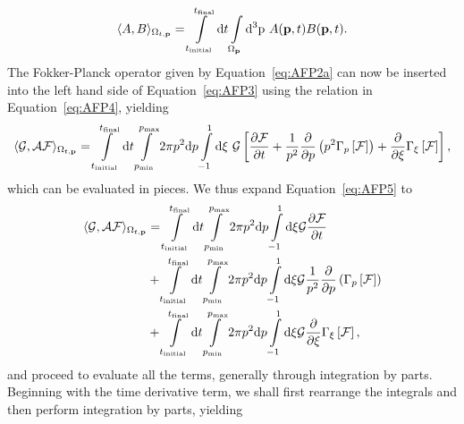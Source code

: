\documentclass[preprint,aip]{revtex4-2}
\begin{document}
\begin{equation}\label{eq:AFP4}
\langle A,B\rangle_{\Omega_{t,\mathbf{p}}} = \int\displaylimits_{t_\mathrm{initial}}^{t_\mathrm{final}}\mathrm{d}t\int\displaylimits_{\Omega_\mathbf{p}}\mathrm{d^3p} \ A(\mathbf{p},t)B(\mathbf{p},t).
\end{equation}
The Fokker-Planck operator given by Equation~\ref{eq:AFP2a} can now be inserted into the left hand side of Equation~\ref{eq:AFP3} using the relation in Equation~\ref{eq:AFP4}, yielding
\begin{equation}\label{eq:AFP5}
	\langle\mathcal{G,AF}\rangle_{\Omega_{t,\mathbf{p}}} = 
	\int\displaylimits_{t_\mathrm{initial}}^{t_\mathrm{final}}\mathrm{d}t
	\int\displaylimits_{p_\mathrm{min}}^{p_\mathrm{max}}2\pi p^2 \mathrm{d}p
	\int\displaylimits_{-1}^{1}\mathrm{d}\xi \ 
		\mathcal{G}\left[ 
		\frac{\partial\mathcal{F}}{\partial t} + 
		\frac{1}{p^2}\frac{\partial}{\partial p}\left(p^2\Gamma_p\left[\mathcal{F}\right]\right) + 
		\frac{\partial}{\partial\xi}\Gamma_\xi\left[\mathcal{F}\right]
		\right],
\end{equation}
which can be evaluated in pieces. We thus expand Equation~\ref{eq:AFP5} to
\begin{equation}\label{eq:AFP6}
\begin{aligned}
	\langle\mathcal{G,AF}\rangle_{\Omega_{t,\mathbf{p}}} &= 
	\int\displaylimits_{t_\mathrm{initial}}^{t_\mathrm{final}}\mathrm{d}t
	\int\displaylimits_{p_\mathrm{min}}^{p_\mathrm{max}}2\pi p^2 \mathrm{d}p
	\int\displaylimits_{-1}^{1}\mathrm{d}\xi \mathcal{G}\frac{\partial\mathcal{F}}{\partial t} \\
	&+ 	\int\displaylimits_{t_\mathrm{initial}}^{t_\mathrm{final}}\mathrm{d}t
	\int\displaylimits_{p_\mathrm{min}}^{p_\mathrm{max}}2\pi p^2 \mathrm{d}p
	\int\displaylimits_{-1}^{1}\mathrm{d}\xi \mathcal{G}\frac{1}{p^2}\frac{\partial}{\partial p}\left(\Gamma_p\left[\mathcal{F}\right]\right) \\
	&+ 	\int\displaylimits_{t_\mathrm{initial}}^{t_\mathrm{final}}\mathrm{d}t
	\int\displaylimits_{p_\mathrm{min}}^{p_\mathrm{max}}2\pi p^2 \mathrm{d}p
	\int\displaylimits_{-1}^{1}\mathrm{d}\xi \mathcal{G}\frac{\partial}{\partial\xi}\Gamma_\xi\left[\mathcal{F}\right],
\end{aligned}
\end{equation}
and proceed to evaluate all the terms, generally through integration by parts. Beginning with the time derivative term, we shall first rearrange the integrals and then perform integration by parts, yielding
\end{document}
